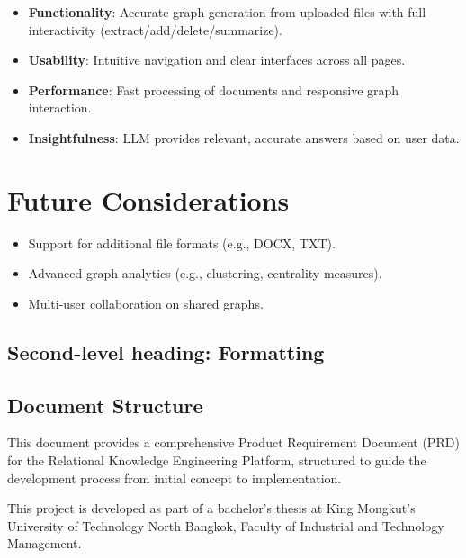 \documentclass[%
 reprint,
 amsmath,amssymb,
 aps,
]{revtex4-2}
\begin{document}
\begin{itemize}
\item \textbf{Functionality}: Accurate graph generation from uploaded files with full interactivity (extract/add/delete/summarize).
\item \textbf{Usability}: Intuitive navigation and clear interfaces across all pages.
\item \textbf{Performance}: Fast processing of documents and responsive graph interaction.
\item \textbf{Insightfulness}: LLM provides relevant, accurate answers based on user data.
\end{itemize}

\section{\label{sec:future_considerations}Future Considerations}

\begin{itemize}
\item Support for additional file formats (e.g., DOCX, TXT).
\item Advanced graph analytics (e.g., clustering, centrality measures).
\item Multi-user collaboration on shared graphs.
\end{itemize}

\subsection{\label{sec:level2}Second-level heading: Formatting}

\subsection{\label{sec:document_structure}Document Structure}

This document provides a comprehensive Product Requirement Document (PRD) for the Relational Knowledge Engineering Platform, structured to guide the development process from initial concept to implementation.

\begin{acknowledgments}
This project is developed as part of a bachelor's thesis at King Mongkut's University of Technology North Bangkok, Faculty of Industrial and Technology Management.
\end{acknowledgments}
\end{document}
